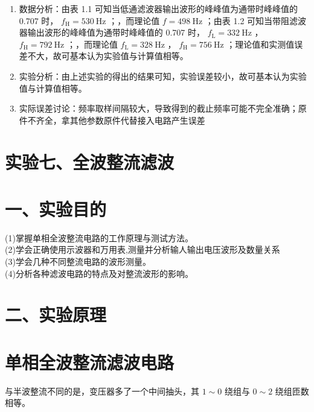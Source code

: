 \documentclass[
  10
]{article}
\providecommand{\tightlist}{%
  \setlength{\itemsep}{0pt}\setlength{\parskip}{0pt}}
\begin{document}
\begin{enumerate}
\def\labelenumi{\arabic{enumi}.}
\tightlist
\item
  数据分析：由表 1.1 可知当低通滤波器输出波形的峰峰值为通带时峰峰值的
  0.707 时， \(f_{\mathrm{H}} = 530 \mathrm{~Hz}\) ；，而理论值
  \(f = 498 \mathrm{~Hz}\) ；由表 1.2
  可知当带阻滤波器输出波形的峰峰值为通带时峰峰值的 0.707 时，
  \(f_{\mathrm{L}} = 332 \mathrm{~Hz}\) ，
  \(f_{\mathrm{H}} = 792 \mathrm{~Hz}\) ；，而理论值
  \(f_{\mathrm{L}} = 328 \mathrm{~Hz}\) ，
  \(f_{\mathrm{H}} = 756 \mathrm{~Hz}\)
  ；理论值和实测值误差不大，故可基本认为实验值与计算值相等。\\
\item
  实验分析：由上述实验的得出的结果可知，实验误差较小，故可基本认为实验值与计算值相等。\\
\item
  实际误差讨论：频率取样间隔较大，导致得到的截止频率可能不完全准确；原件不齐全，拿其他参数原件代替接入电路产生误差
\end{enumerate}

\section{实验七、全波整流滤波}\label{ux5b9eux9a8cux4e03ux5168ux6ce2ux6574ux6d41ux6ee4ux6ce2}

\section{一、实验目的}\label{ux4e00ux5b9eux9a8cux76eeux7684-5}

(1)掌握单相全波整流电路的工作原理与测试方法。\\
(2)学会正确使用示波器和万用表,测量并分析输人输出电压波形及数量关系\\
(3)学会几种不同整流电路的波形测量。\\
(4)分析各种滤波电路的特点及对整流波形的影响。

\section{二、实验原理}\label{ux4e8cux5b9eux9a8cux539fux7406-5}

\section{单相全波整流滤波电路}\label{ux5355ux76f8ux5168ux6ce2ux6574ux6d41ux6ee4ux6ce2ux7535ux8def}

与半波整流不同的是，变压器多了一个中间抽头，其 \(1\sim 0\) 绕组与
\(0\sim 2\) 绕组匝数相等。
\end{document}
